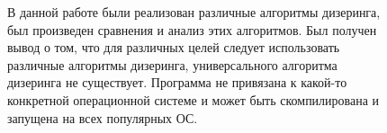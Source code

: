 \Conclusion %

\begin{figure}
В данной работе были реализован различные алгоритмы дизеринга, был произведен сравнения и анализ этих алгоритмов. Был получен вывод о том, что для различных целей следует использовать различные алгоритмы дизеринга, универсального алгоритма дизеринга не существует. Программа не привязана к какой-то конкретной
операционной системе и может быть скомпилирована и запущена на
всех популярных ОС.
\end{figure}
